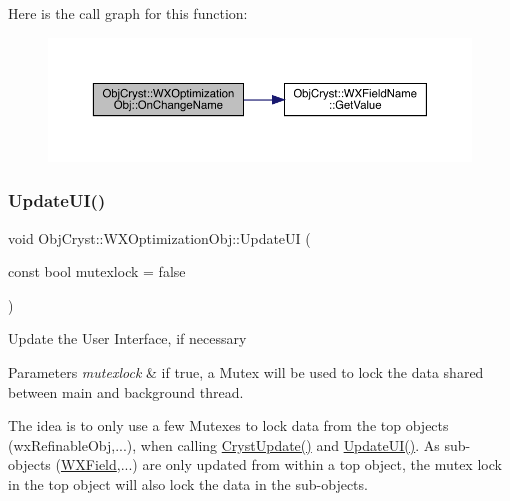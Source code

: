 Here is the call graph for this function\+:
\nopagebreak
\begin{figure}[H]
\begin{center}
\leavevmode
\includegraphics[width=350pt]{class_obj_cryst_1_1_w_x_optimization_obj_a01117540dd4857fd238caf16c391a691_cgraph}
\end{center}
\end{figure}
\mbox{\label{class_obj_cryst_1_1_w_x_optimization_obj_a4643e15059bdd46e65c0ac18d7491787}} 
\subsubsection{\texorpdfstring{UpdateUI()}{UpdateUI()}}
{\footnotesize\ttfamily void Obj\+Cryst\+::\+W\+X\+Optimization\+Obj\+::\+Update\+UI (\begin{DoxyParamCaption}\item[{const bool}]{mutexlock = {\ttfamily false} }\end{DoxyParamCaption})\hspace{0.3cm}{\ttfamily [virtual]}}

Update the User Interface, if necessary


\begin{DoxyParams}{Parameters}
{\em mutexlock} & if true, a Mutex will be used to lock the data shared between main and background thread.\\
\hline
\end{DoxyParams}
The idea is to only use a few Mutexes to lock data from the top objects (wx\+Refinable\+Obj,...), when calling \mbox{\hyperlink{class_obj_cryst_1_1_w_x_optimization_obj_a742684b478a21cec25a74c2b39914d80}{Cryst\+Update()}} and \mbox{\hyperlink{class_obj_cryst_1_1_w_x_optimization_obj_a4643e15059bdd46e65c0ac18d7491787}{Update\+U\+I()}}. As sub-\/objects (\mbox{\hyperlink{class_obj_cryst_1_1_w_x_field}{W\+X\+Field}},...) are only updated from within a top object, the mutex lock in the top object will also lock the data in the sub-\/objects. 

